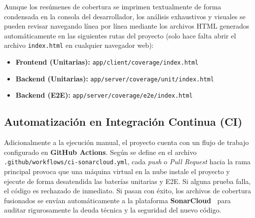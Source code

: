 Aunque los resúmenes de cobertura se imprimen textualmente de forma condensada en la consola del desarrollador, los análisis exhaustivos y visuales se pueden revisar navegando línea por línea mediante los archivos HTML generados automáticamente en las siguientes rutas del proyecto (solo hace falta abrir el archivo \texttt{index.html} en cualquier navegador web):
\begin{itemize}
    \item \textbf{Frontend (Unitarias):} \texttt{app/client/coverage/index.html}
    \item \textbf{Backend (Unitarias):} \texttt{app/server/coverage/unit/index.html}
    \item \textbf{Backend (E2E):} \texttt{app/server/coverage/e2e/index.html}
\end{itemize}


\subsection{Automatización en Integración Continua (CI)}
Adicionalmente a la ejecución manual, el proyecto cuenta con un flujo de trabajo configurado en \textbf{GitHub Actions}. Según se define en el archivo \texttt{.github/workflows/ci-sonarcloud.yml}, cada \textit{push} o \textit{Pull Request} hacia la rama principal provoca que una máquina virtual en la nube instale el proyecto y ejecute de forma desatendida las baterías unitarias y E2E. Si alguna prueba falla, el código es rechazado de inmediato. Si pasan con éxito, los archivos de cobertura fusionados se envían automáticamente a la plataforma \textbf{SonarCloud~\cite{sonarqube}} para auditar rigurosamente la deuda técnica y la seguridad del nuevo código.
